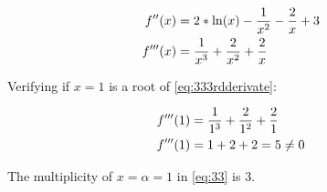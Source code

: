 	\begin{align}
		f''(x) &= 2*\ln(x) - \frac{1}{x^2} - \frac{2}{x} + 3& \notag \\
		f'''(x) &=  \frac{1}{x^3} + \frac{2}{x^2} + \frac{2}{x}&
	\label{eq:333rdderivate}
	\end{align}

	Verifying if $x=1$ is a root of \cref{eq:333rdderivate}:

	\begin{align}
		f'''(1) &=  \frac{1}{1^3} + \frac{2}{1^2} + \frac{2}{1}& \notag \\
		f'''(1) &=  1 + 2 + 2 = 5 \neq 0&
	\label{eq:333rdderivate1x}
	\end{align}

	The multiplicity of $x = \alpha = 1$ in \cref{eq:33} is $3$.